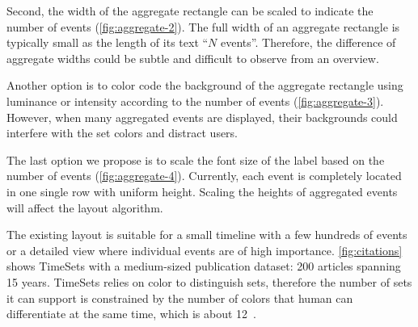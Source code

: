 Second, the width of the aggregate rectangle can be scaled to indicate the number of events (\autoref{fig:aggregate-2}). The full width of an aggregate rectangle is typically small as the length of its text ``$N$ events''. Therefore, the difference of aggregate widths could be subtle and difficult to observe from an overview. 

Another option is to color code the background of the aggregate rectangle using luminance or intensity according to the number of events (\autoref{fig:aggregate-3}). However, when many aggregated events are displayed, their backgrounds could interfere with the set colors and distract users. 

The last option we propose is to scale the font size of the label based on the number of events (\autoref{fig:aggregate-4}). Currently, each event is completely located in one single row with uniform height. Scaling the heights of aggregated events will affect the layout algorithm.

The existing layout is suitable for a small timeline with a few hundreds of events or a detailed view where individual events are of high importance. \autoref{fig:citations} shows TimeSets with a medium-sized publication dataset: 200 articles spanning 15 years. TimeSets relies on color to distinguish sets, therefore the number of sets it can support is constrained by the number of colors that human can differentiate at the same time, which is about 12~\cite{Munzner2014}.